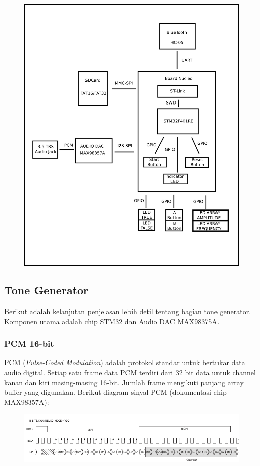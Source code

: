 \documentclass[12pt,]{article}
\begin{document}
	\begin{figure}[H]
		\centering
		\includegraphics[width=0.6\linewidth]{images/overview}
	\end{figure}

	\newpage
	\subsection{Tone Generator}
	Berikut adalah kelanjutan penjelasan lebih detil tentang bagian tone generator.
	Komponen utama adalah chip STM32 dan Audio DAC MAX98375A.
	
	\subsubsection{PCM 16-bit}
	PCM (\textit{Pulse-Coded Modulation}) adalah protokol standar untuk bertukar data audio digital.
	Setiap satu frame data PCM terdiri dari 32 bit data untuk channel kanan dan kiri masing-masing 16-bit.
	Jumlah frame mengikuti panjang array buffer yang digunakan.
	Berikut diagram sinyal PCM (dokumentasi chip MAX98357A):
	\begin{figure}[H]
		\centering
		\includegraphics[width=\linewidth]{images/PCM}
	\end{figure}
\end{document}
